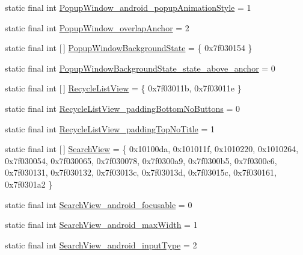 \begin{DoxyCompactItemize}
static final int \mbox{\hyperlink{classandroid_1_1support_1_1v7_1_1appcompat_1_1_r_1_1styleable_ae0a82754ab558f4a8c1da94ff395a68d}{Popup\+Window\+\_\+android\+\_\+popup\+Animation\+Style}} = 1
\item 
static final int \mbox{\hyperlink{classandroid_1_1support_1_1v7_1_1appcompat_1_1_r_1_1styleable_aee90697b851a641b8011c700b5153ffc}{Popup\+Window\+\_\+overlap\+Anchor}} = 2
\item 
static final int \mbox{[}$\,$\mbox{]} \mbox{\hyperlink{classandroid_1_1support_1_1v7_1_1appcompat_1_1_r_1_1styleable_af780db5a661b33d826f07231dfde13ec}{Popup\+Window\+Background\+State}} = \{ 0x7f030154 \}
\item 
static final int \mbox{\hyperlink{classandroid_1_1support_1_1v7_1_1appcompat_1_1_r_1_1styleable_a0288416ef672e1d476c6407516b89ee5}{Popup\+Window\+Background\+State\+\_\+state\+\_\+above\+\_\+anchor}} = 0
\item 
static final int \mbox{[}$\,$\mbox{]} \mbox{\hyperlink{classandroid_1_1support_1_1v7_1_1appcompat_1_1_r_1_1styleable_ad497ba96526376d2bb2a9cf4efa0e91d}{Recycle\+List\+View}} = \{ 0x7f03011b, 0x7f03011e \}
\item 
static final int \mbox{\hyperlink{classandroid_1_1support_1_1v7_1_1appcompat_1_1_r_1_1styleable_ae54b9f42cce37f8fdd340a9401548942}{Recycle\+List\+View\+\_\+padding\+Bottom\+No\+Buttons}} = 0
\item 
static final int \mbox{\hyperlink{classandroid_1_1support_1_1v7_1_1appcompat_1_1_r_1_1styleable_ad34edee58427a47969dad87c706d3b56}{Recycle\+List\+View\+\_\+padding\+Top\+No\+Title}} = 1
\item 
static final int \mbox{[}$\,$\mbox{]} \mbox{\hyperlink{classandroid_1_1support_1_1v7_1_1appcompat_1_1_r_1_1styleable_a01af09df9e38f1e4f57165c3d3cee9fe}{Search\+View}} = \{ 0x10100da, 0x101011f, 0x1010220, 0x1010264, 0x7f030054, 0x7f030065, 0x7f030078, 0x7f0300a9, 0x7f0300b5, 0x7f0300c6, 0x7f030131, 0x7f030132, 0x7f03013c, 0x7f03013d, 0x7f03015c, 0x7f030161, 0x7f0301a2 \}
\item 
static final int \mbox{\hyperlink{classandroid_1_1support_1_1v7_1_1appcompat_1_1_r_1_1styleable_a45075e501403be7f1c519d24590d6ebf}{Search\+View\+\_\+android\+\_\+focusable}} = 0
\item 
static final int \mbox{\hyperlink{classandroid_1_1support_1_1v7_1_1appcompat_1_1_r_1_1styleable_a66c04bc25e3cfb1261d1c3bcad618e05}{Search\+View\+\_\+android\+\_\+max\+Width}} = 1
\item 
static final int \mbox{\hyperlink{classandroid_1_1support_1_1v7_1_1appcompat_1_1_r_1_1styleable_a87e050ae0c55c9b057b45f75640c7c72}{Search\+View\+\_\+android\+\_\+input\+Type}} = 2

\end{DoxyCompactItemize}
